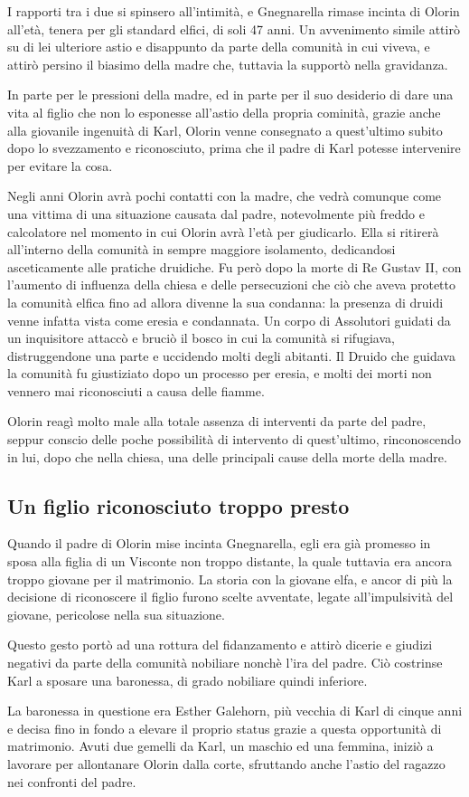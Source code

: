 I rapporti tra i due si spinsero all'intimità, e Gnegnarella rimase incinta di Olorin all'età, tenera per gli standard elfici, di soli 47 anni. Un avvenimento simile attirò su di lei ulteriore astio e disappunto da parte della comunità in cui viveva, e attirò persino il biasimo della madre che, tuttavia la supportò nella gravidanza.

In parte per le pressioni della madre, ed in parte per il suo desiderio di dare una vita al figlio che non lo esponesse all'astio della propria cominità, grazie anche alla giovanile ingenuità di Karl, Olorin venne consegnato a quest'ultimo subito dopo lo svezzamento e riconosciuto, prima che il padre di Karl potesse intervenire per evitare la cosa.

Negli anni Olorin avrà pochi contatti con la madre, che vedrà comunque come una vittima di una situazione causata dal padre, notevolmente più freddo e calcolatore nel momento in cui Olorin avrà l'età per giudicarlo. Ella si ritirerà all'interno della comunità in sempre maggiore isolamento, dedicandosi asceticamente alle pratiche druidiche.
Fu però dopo la morte di Re Gustav II, con l'aumento di influenza della chiesa e delle persecuzioni che ciò che aveva protetto la comunità elfica fino ad allora divenne la sua condanna: la presenza di druidi venne infatta vista come eresia e condannata. Un corpo di Assolutori guidati da un inquisitore attaccò e bruciò il bosco in cui la comunità si rifugiava, distruggendone una parte e uccidendo molti degli abitanti. Il Druido che guidava la comunità fu giustiziato dopo un processo per eresia, e molti dei morti non vennero mai riconosciuti a causa delle fiamme.

Olorin reagì molto male alla totale assenza di interventi da parte del padre, seppur conscio delle poche possibilità di intervento di quest'ultimo, rinconoscendo in lui, dopo che nella chiesa, una delle principali cause della morte della madre.

\subsection{Un figlio riconosciuto troppo presto}

Quando il padre di Olorin mise incinta Gnegnarella, egli era già promesso in sposa alla figlia di un Visconte non troppo distante, la quale tuttavia era ancora troppo giovane per il matrimonio. La storia con la giovane elfa, e ancor di più la decisione di riconoscere il figlio furono scelte avventate, legate all'impulsività del giovane, pericolose nella sua situazione.

Questo gesto portò ad una rottura del fidanzamento e attirò dicerie e giudizi negativi da parte della comunità nobiliare nonchè l'ira del padre. Ciò costrinse Karl a sposare una baronessa, di grado nobiliare quindi inferiore.

La baronessa in questione era Esther Galehorn, più vecchia di Karl di cinque anni e decisa fino in fondo a elevare il proprio status grazie a questa opportunità di matrimonio. Avuti due gemelli da Karl, un maschio ed una femmina, iniziò a lavorare per allontanare Olorin dalla corte, sfruttando anche l'astio del ragazzo nei confronti del padre.
